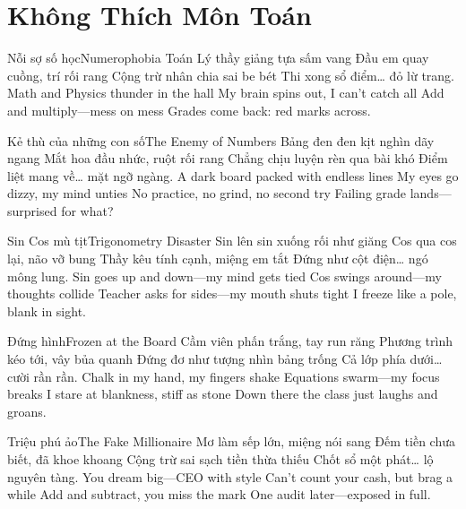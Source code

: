 \chapter{Không Thích Môn Toán}
\begin{tutuyetbox}{Nỗi sợ số học}{Numerophobia}
Toán Lý thầy giảng tựa sấm vang
Đầu em quay cuồng, trí rối rang
Cộng trừ nhân chia sai be bét
Thi xong sổ điểm… đỏ lừ trang.
\tcblower
Math and Physics thunder in the hall
My brain spins out, I can’t catch all
Add and multiply—mess on mess
Grades come back: red marks across.
\end{tutuyetbox}

\begin{tutuyetbox}{Kẻ thù của những con số}{The Enemy of Numbers}
Bảng đen đen kịt nghìn dãy ngang
Mắt hoa đầu nhức, ruột rối rang
Chẳng chịu luyện rèn qua bài khó
Điểm liệt mang về… mặt ngỡ ngàng.
\tcblower
A dark board packed with endless lines
My eyes go dizzy, my mind unties
No practice, no grind, no second try
Failing grade lands—surprised for what?
\end{tutuyetbox}

\begin{tutuyetbox}{Sin Cos mù tịt}{Trigonometry Disaster}
Sin lên sin xuống rối như giăng
Cos qua cos lại, não vỡ bung
Thầy kêu tính cạnh, miệng em tắt
Đứng như cột điện… ngó mông lung.
\tcblower
Sin goes up and down—my mind gets tied
Cos swings around—my thoughts collide
Teacher asks for sides—my mouth shuts tight
I freeze like a pole, blank in sight.
\end{tutuyetbox}

\begin{tutuyetbox}{Đứng hình}{Frozen at the Board}
Cầm viên phấn trắng, tay run răng
Phương trình kéo tới, vây bủa quanh
Đứng đơ như tượng nhìn bảng trống
Cả lớp phía dưới… cười rần rần.
\tcblower
Chalk in my hand, my fingers shake
Equations swarm—my focus breaks
I stare at blankness, stiff as stone
Down there the class just laughs and groans.
\end{tutuyetbox}

\begin{tutuyetbox}{Triệu phú ảo}{The Fake Millionaire}
Mơ làm sếp lớn, miệng nói sang
Đếm tiền chưa biết, đã khoe khoang
Cộng trừ sai sạch tiền thừa thiếu
Chốt sổ một phát… lộ nguyên tàng.
\tcblower
You dream big—CEO with style
Can’t count your cash, but brag a while
Add and subtract, you miss the mark
One audit later—exposed in full.
\end{tutuyetbox}

